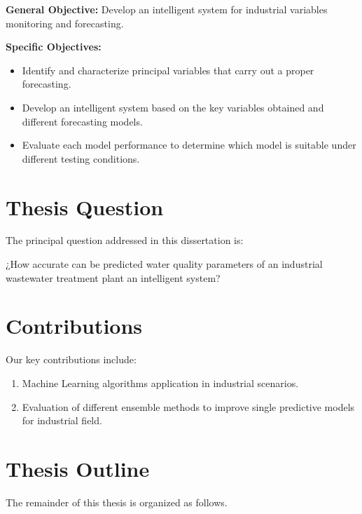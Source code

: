 \textbf{General Objective:} Develop an intelligent system for industrial variables monitoring and forecasting.

\textbf{Specific Objectives:}

\begin{itemize}
\item Identify and characterize principal variables that carry out a proper forecasting.
\item Develop an intelligent system based on the key variables obtained and different forecasting models.
\item Evaluate each model performance to determine which model is suitable under different testing conditions.
\end{itemize}

\section{Thesis Question}
\label{s:Question}
The principal question addressed in this dissertation is:

¿How accurate can be predicted water quality parameters of an industrial wastewater treatment plant an intelligent system?

\section{Contributions}
\label{s:Contributions}

Our key contributions include:

\begin{enumerate}

  \item Machine Learning algorithms application in industrial scenarios. 
  
  \item Evaluation of different ensemble methods to improve single predictive models for industrial field.

\end{enumerate}

\section{Thesis Outline}
\label{s:Outline}

The remainder of this thesis is organized as follows. 


